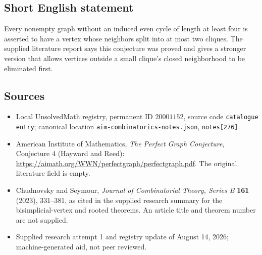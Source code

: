 \documentclass[11pt]{article}
\begin{document}
\subsection{Short English statement}
Every nonempty graph without an induced even cycle of length at least four is asserted to have a vertex whose neighbors split into at most two cliques. The supplied literature report says this conjecture was proved and gives a stronger version that allows vertices outside a small clique's closed neighborhood to be eliminated first.
\subsection{Sources}
\begin{itemize}
\item Local UnsolvedMath registry, permanent ID \(20001152\), source code \texttt{catalogue entry}; canonical location \texttt{aim-combinatorics-notes.json}, \texttt{notes[276]}.
\item American Institute of Mathematics, \emph{The Perfect Graph Conjecture}, Conjecture 4 (Hayward and Reed): \url{https://aimath.org/WWN/perfectgraph/perfectgraph.pdf}. The original literature field is empty.
\item Chudnovsky and Seymour, \emph{Journal of Combinatorial Theory, Series B} \textbf{161} (2023), 331--381, as cited in the supplied research summary for the bisimplicial-vertex and rooted theorems. An article title and theorem number are not supplied.
\item Supplied research attempt 1 and registry update of August 14, 2026; machine-generated aid, not peer reviewed.
\end{itemize}
\end{document}
